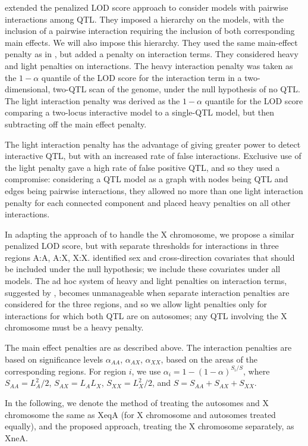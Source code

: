 \documentclass[12pt,letterpaper]{article}
\begin{document}
\citet{Manichaikul2009} extended the penalized LOD score approach to
consider models with pairwise interactions among QTL. They imposed a
hierarchy on the models, with the inclusion of a pairwise interaction
requiring the inclusion of both corresponding main effects. We will
also impose this hierarchy. They used the same main-effect penalty as
in \citet{Broman2002}, but added a penalty on interaction terms. They
considered heavy and light penalties on interactions. The heavy
interaction penalty was taken as the $1-\alpha$ quantile of the LOD
score for the interaction term in a two-dimensional, two-QTL scan of
the genome, under the null hypothesis of no QTL. The light interaction
penalty was derived as the $1-\alpha$ quantile for the LOD score
comparing a two-locus interactive model to a single-QTL model, but
then subtracting off the main effect penalty.

The light interaction penalty has the advantage of giving greater
power to detect interactive QTL, but with an increased rate of false
interactions. Exclusive use of the light penalty gave a high rate of
false positive QTL, and so they used a compromise: considering a QTL
model as a graph with nodes being QTL and edges being pairwise
interactions, they allowed no more than one light interaction penalty
for each connected component and placed heavy penalties on all other
interactions.

In adapting the approach of \citet{Manichaikul2009} to handle the X
chromosome, we propose a similar penalized LOD score, but with
separate thresholds for interactions in three regions A:A, A:X,
X:X. \citet{Broman2006} identified sex and cross-direction
covariates that should be included under the null hypothesis; we
include these covariates under all models. The ad hoc system of heavy and
light penalties on interaction terms, suggested by
\citet{Manichaikul2009}, becomes unmanageable when separate
interaction penalties are considered for the three regions, and so we
allow light penalties only for interactions for which both QTL are on
autosomes; any QTL involving the X chromosome must be a heavy penalty.

The main effect penalties are as described above. The interaction
penalties are based on significance levels $\alpha_{AA}$,
$\alpha_{AX}$, $\alpha_{XX}$, based on the areas of the corresponding
regions. For region $i$, we use $\alpha_i = 1 - (1-\alpha)^{S_i/S}$,
where $S_{AA} = L_A^2/2$, $S_{AX} = L_AL_X$, $S_{XX} = L_X^2/2$, and
$S = S_{AA} + S_{AX} + S_{XX}$.

In the following, we denote the method of \citet{Manichaikul2009}
treating the autosomes and X chromosome the same as XeqA (for X
chromosome and autosomes treated equally), and the proposed approach,
treating the X chromosome separately, as XneA.
\end{document}
